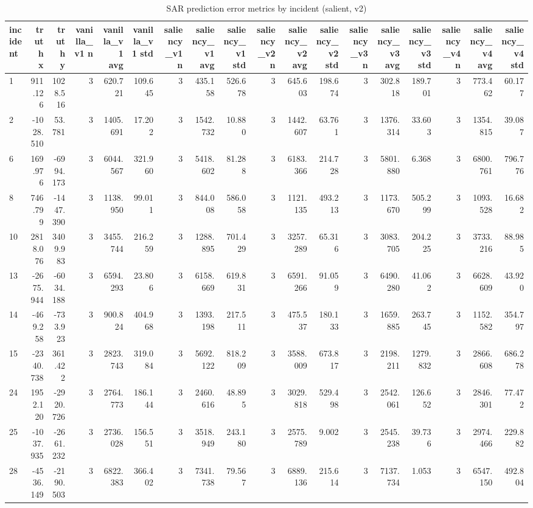 \begin{table}[ht]
\centering
\caption{SAR prediction error metrics by incident (salient, v2)}
\label{tab:sar-incident-errors-salient,-v2}
\begin{tabular}{lrrrrrrrrrrrrrrrrr}
\hline
incident & truth x & truth y & vanilla\_v1 n & vanilla\_v1 avg & vanilla\_v1 std & saliency\_v1 n & saliency\_v1 avg & saliency\_v1 std & saliency\_v2 n & saliency\_v2 avg & saliency\_v2 std & saliency\_v3 n & saliency\_v3 avg & saliency\_v3 std & saliency\_v4 n & saliency\_v4 avg & saliency\_v4 std \\
\hline
1 & 911.126 & 1028.516 & 3 & 620.721 & 109.645 & 3 & 435.158 & 526.678 & 3 & 645.603 & 198.674 & 3 & 302.818 & 189.701 & 3 & 773.462 & 60.177 \\
2 & -1028.510 & 53.781 & 3 & 1405.691 & 17.202 & 3 & 1542.732 & 10.880 & 3 & 1442.607 & 63.761 & 3 & 1376.314 & 33.603 & 3 & 1354.815 & 39.087 \\
6 & 169.976 & -6994.173 & 3 & 6044.567 & 321.960 & 3 & 5418.602 & 81.288 & 3 & 6183.366 & 214.728 & 3 & 5801.880 & 6.368 & 3 & 6800.761 & 796.776 \\
8 & 746.799 & -1447.390 & 3 & 1138.950 & 99.011 & 3 & 844.008 & 586.058 & 3 & 1121.135 & 493.213 & 3 & 1173.670 & 505.299 & 3 & 1093.528 & 16.682 \\
10 & 2818.076 & 3409.983 & 3 & 3455.744 & 216.259 & 3 & 1288.895 & 701.429 & 3 & 3257.289 & 65.316 & 3 & 3083.705 & 204.225 & 3 & 3733.216 & 88.985 \\
13 & -2675.944 & -6034.188 & 3 & 6594.293 & 23.806 & 3 & 6158.669 & 619.831 & 3 & 6591.266 & 91.059 & 3 & 6490.280 & 41.062 & 3 & 6628.609 & 43.920 \\
14 & -469.258 & -733.923 & 3 & 900.824 & 404.968 & 3 & 1393.198 & 217.511 & 3 & 475.537 & 180.133 & 3 & 1659.885 & 263.745 & 3 & 1152.582 & 354.797 \\
15 & -2340.738 & 361.422 & 3 & 2823.743 & 319.084 & 3 & 5692.122 & 818.209 & 3 & 3588.009 & 673.817 & 3 & 2198.211 & 1279.832 & 3 & 2866.608 & 686.278 \\
24 & 1952.120 & -2920.726 & 3 & 2764.773 & 186.144 & 3 & 2460.616 & 48.895 & 3 & 3029.818 & 529.498 & 3 & 2542.061 & 126.652 & 3 & 2846.301 & 77.472 \\
25 & -1037.935 & -2661.232 & 3 & 2736.028 & 156.551 & 3 & 3518.949 & 243.180 & 3 & 2575.789 & 9.002 & 3 & 2545.238 & 39.736 & 3 & 2974.466 & 229.882 \\
28 & -4536.149 & -2190.503 & 3 & 6822.383 & 366.402 & 3 & 7341.738 & 79.567 & 3 & 6889.136 & 215.614 & 3 & 7137.734 & 1.053 & 3 & 6547.150 & 492.804 \\

\end{tabular}
\end{table}
